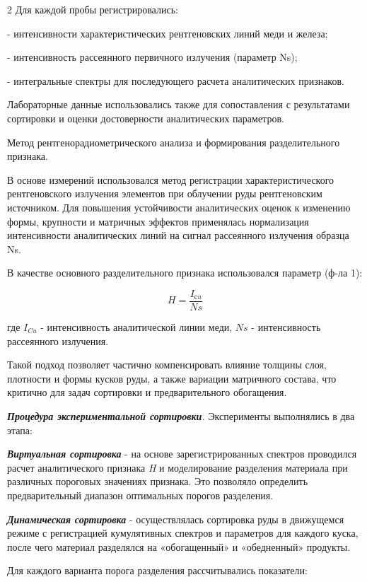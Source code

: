 \begin{multicols}{2}
Для каждой пробы регистрировались:

- интенсивности характеристических рентгеновских линий меди и железа;

- интенсивность рассеянного первичного излучения (параметр Ns);

- интегральные спектры для последующего расчета аналитических признаков.

Лабораторные данные использовались также для сопоставления с
результатами сортировки и оценки достоверности аналитических параметров.

Метод рентгенорадиометрического анализа и формирования разделительного
признака.

В основе измерений использовался метод регистрации характеристического
рентгеновского излучения элементов при облучении руды рентгеновским
источником. Для повышения устойчивости аналитических оценок к изменению
формы, крупности и матричных эффектов применялась нормализация
интенсивности аналитических линий на сигнал рассеянного излучения
образца Ns.

В качестве основного разделительного признака использовался параметр
(ф-ла 1):

\begin{equation}
H=\frac{I_{сu}}{Ns}
\end{equation}

где \(I_{Cu}\) - интенсивность аналитической
линии меди, \(Ns\) - интенсивность рассеянного излучения.

Такой подход позволяет частично компенсировать влияние толщины слоя,
плотности и формы кусков руды, а также вариации матричного состава, что
критично для задач сортировки и предварительного обогащения.

\emph{{\bfseries Процедура экспериментальной сортировки}.} Эксперименты
выполнялись в два этапа:

\emph{{\bfseries Виртуальная сортировка}} - на основе зарегистрированных
спектров проводился расчет аналитического признака \emph{H} и
моделирование разделения материала при различных пороговых значениях
признака. Это позволяло определить предварительный диапазон оптимальных
порогов разделения.

\emph{{\bfseries Динамическая сортировка}} - осуществлялась сортировка руды
в движущемся режиме с регистрацией кумулятивных спектров и параметров
для каждого куска, после чего материал разделялся на «обогащенный» и
«обедненный» продукты.

Для каждого варианта порога разделения рассчитывались показатели:


\end{multicols}
